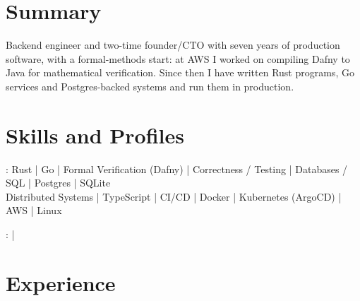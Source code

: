 \documentclass[print]{jack-resume}
\begin{document}
\pagecolor{darkmodeBackground}


\begin{minipage}[t][1cm][t]{.03\textwidth}
    \hfill
\end{minipage}

\section{Summary}
Backend engineer and two-time founder/CTO with seven years of production software, with a formal-methods start: at AWS I worked on compiling Dafny to Java for mathematical verification. Since then I have written Rust programs, Go services and Postgres-backed systems and run them in production.
\sectionsep

\section{Skills and Profiles}
:
Rust \hfill | \hfill
Go \hfill | \hfill
Formal Verification (Dafny) \hfill | \hfill
Correctness / Testing \hfill | \hfill
Databases / SQL \hfill | \hfill
Postgres \hfill | \hfill
SQLite \\
\hspace{1.0cm} Distributed Systems \hfill | \hfill
TypeScript \hfill | \hfill
CI/CD \hfill | \hfill
Docker \hfill | \hfill
Kubernetes (ArgoCD) \hfill | \hfill
AWS \hfill | \hfill
Linux \\

\raggedright{
    :
      \href{https://www.linkedin.com/in/jack-sturtevant/}{ \ExternalLink} |
     \href{https://github.com/jacksturt}{ \ExternalLink}}

\section{Experience}
\end{document}
